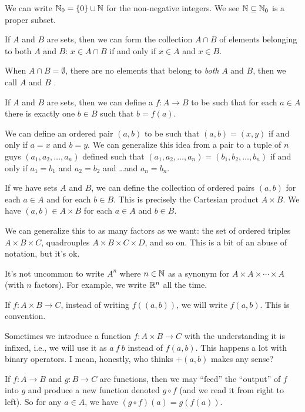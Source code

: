 \begin{example}
We can write $\mathbb{N}_{0}=\{0\}\cup\mathbb{N}$ for the non-negative integers. We
see $\mathbb{N}\subseteq\mathbb{N}_{0}$ is a proper subset.
\end{example}

If $A$ and $B$ are sets, then we can form the collection $A\cap B$ of elements
belonging to both $A$ and $B$: $x\in A\cap B$ if and only if $x\in A$
and $x\in B$.

When $A\cap B=\emptyset$, there are no elements that belong to
\emph{both} $A$ and $B$, then we call $A$ and $B$ .

If $A$ and $B$ are sets, then we can define a 
$f\colon A\to B$ to be such that for each $a\in A$ there is exactly one
$b\in B$ such that $b=f(a)$.

We can define an ordered pair $(a,b)$ to be such that $(a,b)=(x,y)$ if
and only if $a=x$ and $b=y$. We can generalize this idea from a pair to
a tuple of $n$ guys $(a_{1}, a_{2}, \dots, a_{n})$ defined such that
$(a_{1},a_{2},\dots,a_{n})=(b_{1},b_{2},\dots,b_{n})$ if and only if
$a_{1}=b_{1}$ and $a_{2}=b_{2}$ and \dots and $a_{n}=b_{n}$.

If we have sets $A$ and $B$, we can define the collection of ordered
pairs $(a,b)$ for each $a\in A$ and for each $b\in B$. This is precisely
the Cartesian product $A\times B$. We have $(a,b)\in A\times B$ for each
$a\in A$ and $b\in B$.

We can generalize this to as many factors as we want: the set of ordered triples
$A\times B\times C$, quadrouples $A\times B\times C\times D$, and so
on. This is a bit of an abuse of notation, but it's ok.

It's not uncommon to write $A^{n}$ where $n\in\mathbb{N}$ as a synonym for
$A\times A\times\cdots\times A$ (with $n$ factors). For example, we
write $\mathbb{R}^{n}$ all the time.

If $f\colon A\times B\to C$, instead of writing $f((a,b))$, we will
write $f(a,b)$. This is convention.

Sometimes we introduce a function $f\colon A\times B\to C$ with the
understanding it is infixed, i.e., we will use it as $a~f~b$ instead of
$f(a,b)$. This happens a lot with binary operators. I mean, honestly,
who thinks $+(a,b)$ makes any sense?

 If $f\colon A\to B$ and $g\colon B\to C$ are
functions, then we may ``feed'' the ``output'' of $f$ into $g$ and
produce a new function denoted $g\circ f$ (and we read it from right to left).
So for any $a\in A$, we have $(g\circ f)(a) = g\left(f(a)\right)$.

